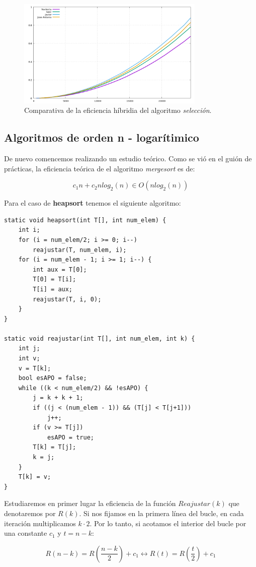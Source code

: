 \documentclass[11pt,a4paper]{article}
\begin{document}
\begin{figure}[H]
	\centering
	\includegraphics[width=0.8\textwidth]{../plots/seleccion}
	\caption{Comparativa de la eficiencia híbridia del algoritmo \emph{selección}.}
\end{figure}

\subsection{Algoritmos de orden n - logarítimico}

De nuevo comencemos realizando un estudio teórico. Como se vió en el
guión de prácticas, la eficiencia teórica de el algoritmo
\emph{mergesort} es de:

$$c_1n + c_2nlog_2(n) \in O(nlog_2(n))$$

Para el caso de \textbf{heapsort} tenemos el siguiente algoritmo:

\begin{lstlisting}
static void heapsort(int T[], int num_elem) {
	int i;
	for (i = num_elem/2; i >= 0; i--)
		reajustar(T, num_elem, i);
	for (i = num_elem - 1; i >= 1; i--) {
		int aux = T[0];
		T[0] = T[i];
		T[i] = aux;
		reajustar(T, i, 0);
	}
}

static void reajustar(int T[], int num_elem, int k) {
	int j;
	int v;
	v = T[k];
	bool esAPO = false;
	while ((k < num_elem/2) && !esAPO) {
		j = k + k + 1;
		if ((j < (num_elem - 1)) && (T[j] < T[j+1]))
			j++;
		if (v >= T[j])
			esAPO = true;
		T[k] = T[j];
		k = j;
	}
	T[k] = v;
}
\end{lstlisting}

Estudiaremos en primer lugar la eficiencia de la función
$Reajustar(k)$ que denotaremos por $R(k)$. Si nos fijamos en la
primera línea del bucle, en cada iteración multiplicamos $k \cdot
2$. Por lo tanto, si acotamos el interior del bucle por una constante
$c_1$ y $ t = n-k$:

$$R(n-k) = R(\frac{n-k}{2}) + c_1 \leftrightarrow R(t) = R(\frac{t}{2}) + c_1$$
\end{document}
